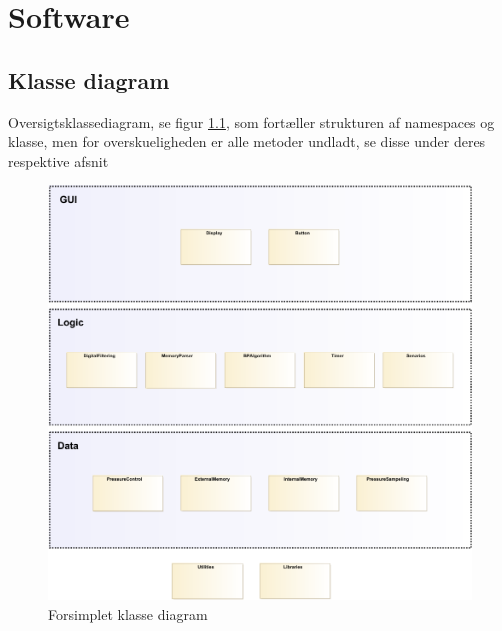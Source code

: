\chapter{Software}

\section{Klasse diagram}
Oversigtsklassediagram, se figur \ref{fig:classDiagramSimple}, som fortæller strukturen af namespaces og klasse, men for overskueligheden er alle metoder undladt, se disse under deres respektive afsnit
\begin{figure}[H]
	\includegraphics[width=\textwidth]{Implementeringsdokument/klassediagram_forsimplet-crop.pdf}
	\caption{Forsimplet klasse diagram}\label{fig:classDiagramSimple}
\end{figure}
\newpage







